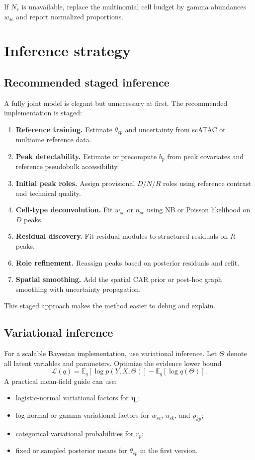 \documentclass[11pt]{article}
\newcommand{\E}{\mathbb{E}}
\begin{document}
If $N_s$ is unavailable, replace the multinomial cell budget by gamma abundances $w_{sc}$ and report normalized proportions.

\section{Inference strategy}

\subsection{Recommended staged inference}

A fully joint model is elegant but unnecessary at first. The recommended implementation is staged:

\begin{enumerate}
    \item \textbf{Reference training.} Estimate $\theta_{cp}$ and uncertainty from scATAC or multiome reference data.
    \item \textbf{Peak detectability.} Estimate or precompute $b_p$ from peak covariates and reference pseudobulk accessibility.
    \item \textbf{Initial peak roles.} Assign provisional $D/N/R$ roles using reference contrast and technical quality.
    \item \textbf{Cell-type deconvolution.} Fit $w_{sc}$ or $n_{sc}$ using NB or Poisson likelihood on $D$ peaks.
    \item \textbf{Residual discovery.} Fit residual modules to structured residuals on $R$ peaks.
    \item \textbf{Role refinement.} Reassign peaks based on posterior residuals and refit.
    \item \textbf{Spatial smoothing.} Add the spatial CAR prior or post-hoc graph smoothing with uncertainty propagation.
\end{enumerate}

This staged approach makes the method easier to debug and explain.

\subsection{Variational inference}

For a scalable Bayesian implementation, use variational inference. Let $\Theta$ denote all latent variables and parameters. Optimize the evidence lower bound
\[
\mathcal{L}(q)
=
\E_q[\log p(Y,X,\Theta)]-\E_q[\log q(\Theta)].
\]
A practical mean-field guide can use:
\begin{itemize}
    \item logistic-normal variational factors for $\boldsymbol{\eta}_s$;
    \item log-normal or gamma variational factors for $w_{sc}$, $u_{sk}$, and $\rho_{kp}$;
    \item categorical variational probabilities for $r_p$;
    \item fixed or sampled posterior means for $\theta_{cp}$ in the first version.
\end{itemize}
\end{document}
